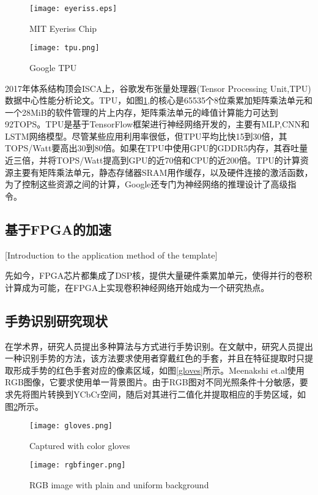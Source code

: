 \begin{figure}[h]
\begin{minipage}{0.5\linewidth}
\centering
\texttt{[image: eyeriss.eps]}
\caption{MIT Eyeriss Chip}
\label{eyeriss}
\end{minipage}
\begin{minipage}{0.5\linewidth}
\centering
\texttt{[image: tpu.png]}
\caption{Google TPU}
\label{tpu}
\end{minipage}
\end{figure}

2017年体系结构顶会ISCA上，谷歌发布张量处理器(Tensor Processing Unit,TPU)数据中心性能分析论文\cite{jouppi2017datacenter}。TPU，如图\ref{tpu},的核心是65535个8位乘累加矩阵乘法单元和一个28MiB的软件管理的片上内存，矩阵乘法单元的峰值计算能力可达到92TOPS。TPU是基于TensorFlow框架进行神经网络开发的，主要有MLP,CNN和LSTM网络模型。尽管某些应用利用率很低，但TPU平均比快15到30倍，其TOPS/Watt要高出30到80倍。如果在TPU中使用GPU的GDDR5内存，其吞吐量近三倍，并将TOPS/Watt提高到GPU的近70倍和CPU的近200倍。TPU的计算资源主要有矩阵乘法单元，静态存储器SRAM用作缓存，以及硬件连接的激活函数，为了控制这些资源之间的计算，Google还专门为神经网络的推理设计了高级指令。

\subsection{基于FPGA的加速}[Introduction to the application method of the template]

先如今，FPGA芯片都集成了DSP核，提供大量硬件乘累加单元，使得并行的卷积计算成为可能，在FPGA上实现卷积神经网络开始成为一个研究热点。




\subsection{手势识别研究现状}
在学术界，研究人员提出多种算法与方式进行手势识别。在文献\cite{agrawal2011tutor}中，研究人员提出一种识别手势的方法，该方法要求使用者穿戴红色的手套，并且在特征提取时只提取形成手势的红色手套对应的像素区域，如图\ref{gloves}所示。Meenakshi et.al\cite{panwar2011hand}使用RGB图像，它要求使用单一背景图片。由于RGB图对不同光照条件十分敏感，要求先将图片转换到YCbCr空间，随后对其进行二值化并提取相应的手势区域，如图\ref{rgbfinger}所示。

\begin{figure}[h]
\begin{minipage}{0.4\linewidth}
\centering
\texttt{[image: gloves.png]}
\caption{Captured with color gloves}
\label{gloves}
\end{minipage}
\begin{minipage}{0.6\linewidth}
\centering
\texttt{[image: rgbfinger.png]}
\caption{RGB image with plain and uniform background}
\label{rgbfinger}
\end{minipage}
\end{figure}



